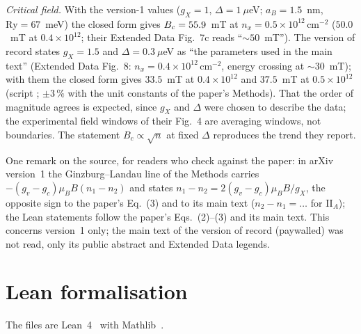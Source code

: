 \documentclass[11pt,a4paper]{article}
\begin{document}
\emph{Critical field.} With the version-1 values ($g_X=1$, $\Delta=1~\mu$eV; $a_B=1.5$~nm, $\mathrm{Ry}=67$~meV) the closed form gives
$B_c=55.9$~mT at $n_x=0.5\times10^{12}\,\mathrm{cm}^{-2}$ ($50.0$~mT at $0.4\times10^{12}$; their Extended Data Fig.~7c reads
``$\sim50$~mT''). The version of record states $g_X=1.5$ and $\Delta=0.3~\mu$eV as ``the parameters used in the main text'' (Extended
Data Fig.~8: $n_x=0.4\times10^{12}\,\mathrm{cm}^{-2}$, energy crossing at $\sim30$~mT); with them the closed form gives $33.5$~mT at
$0.4\times10^{12}$ and $37.5$~mT at $0.5\times10^{12}$ (script ; $\pm3\,\%$
with the unit constants of the paper's Methods). That the order of magnitude agrees is expected, since $g_X$ and $\Delta$ were chosen
to describe the data; the experimental field windows of their Fig.~4 are averaging windows, not boundaries. The statement $B_c\propto\sqrt n$
at fixed $\Delta$ reproduces the trend they report.

One remark on the source, for readers who check against the paper: in arXiv version~1 the Ginzburg--Landau line of the Methods carries
$-(g_v-g_c)\mu_BB(n_1-n_2)$ and states $n_1-n_2=2(g_v-g_c)\mu_BB/g_X$, the opposite sign to the paper's Eq.~(3) and to its main text
($n_2-n_1=\dots$ for II$_A$); the Lean statements follow the paper's Eqs.~(2)--(3) and its main text. This concerns version~1 only; the main text of the version of
record (paywalled) was not read, only its public abstract and Extended Data legends.

\section{Lean formalisation}\label{sec:lean}

The files are Lean~4~\cite{deMoura2021} with Mathlib~\cite{Mathlib2020}.
\end{document}
